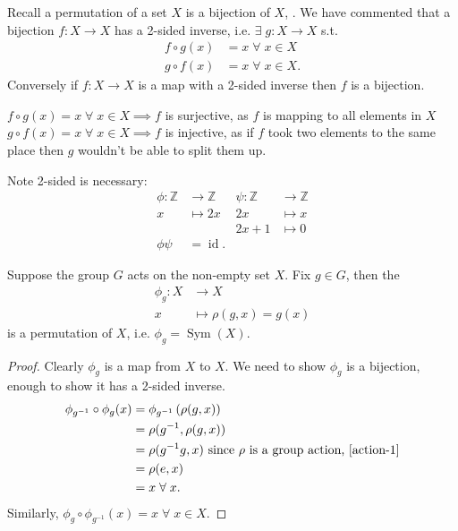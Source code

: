 \begin{remark}
    Recall a permutation of a set $X$ is a bijection of $X$, .
    We have commented that a bijection $f : X \to X$ has a 2-sided inverse, i.e. $\exists \; g : X \to X$ s.t.
    \begin{align*}
        f \circ g (x) &= x \; \forall \; x \in X \\
        g \circ f (x) &= x \; \forall \; x \in X.
    \end{align*}
    Conversely if $f : X \to X$ is a map with a 2-sided inverse then $f$ is a bijection.

    $f \circ g(x) = x \; \forall \; x \in X \implies f$ is surjective, as $f$ is mapping to all elements in $X$ \\
    $g \circ f(x) = x \; \forall \; x \in X \implies f$ is injective, as if $f$ took two elements to the same place then $g$ wouldn't be able to split them up.

    Note 2-sided is necessary:
    \begin{align*}
        \phi : \mathbb{Z} &\to \mathbb{Z} & \psi : \mathbb{Z} &\to \mathbb{Z}\\
        x &\mapsto 2x & 2x & \mapsto x \\
        && 2x + 1 &\mapsto 0 \\
        \phi \psi &= \operatorname{id}. &&
    \end{align*} 
\end{remark} 

\begin{lemma} \label{lem:16}
    Suppose the group $G$ acts on the non-empty set $X$.
    Fix $g \in G$, then the 
    \begin{align*}
        \phi_g : X &\to X \\
        x &\mapsto \rho(g, x) = g(x)
    \end{align*} is a permutation of $X$, i.e. $\phi_g = \operatorname{Sym}(X)$.
\end{lemma} 

\begin{proof}
    Clearly $\phi_g$ is a map from $X$ to $X$.
    We need to show $\phi_g$ is a bijection, enough to show it has a 2-sided inverse.
    \begin{align*}
        \phi_{g^{-1}} \circ \phi_g (x) &= \phi_{g^{-1}} \left( \rho (g, x) \right) \\
        &= \rho(g^{-1}, \rho(g, x)) \\
        &= \rho(g^{-1} g, x) \text{ since $\rho$ is a group action, \ref{action-1}} \\
        &= \rho(e, x) \\
        &= x \; \forall \; x.
    \end{align*} 
    Similarly, $\phi_g \circ \phi_{g^{-1}}(x) = x \; \forall \; x \in X$.
\end{proof} 

